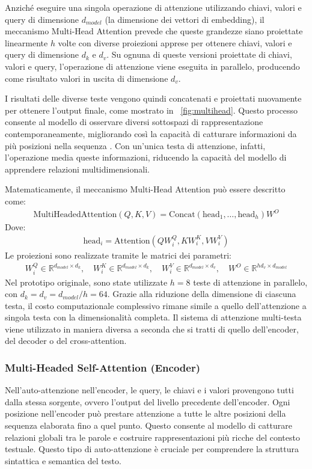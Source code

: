 Anziché eseguire una singola operazione di attenzione utilizzando chiavi, valori e query di dimensione \(d_{model}\) (la dimensione dei vettori di embedding), il meccanismo Multi-Head Attention prevede che queste grandezze siano proiettate linearmente \(h\) volte con diverse proiezioni apprese per ottenere chiavi, valori e query di dimensione \(d_k\) e \(d_v\). Su ognuna di queste versioni proiettate di chiavi, valori e query, l'operazione di attenzione viene eseguita in parallelo, producendo come risultato valori in uscita di dimensione \(d_v\).

I risultati delle diverse teste vengono quindi concatenati e proiettati nuovamente per ottenere l'output finale, come mostrato in \figurename{~\ref{fig:multihead}}. Questo processo consente al modello di osservare diversi sottospazi di rappresentazione contemporaneamente, migliorando così la capacità di catturare informazioni da più posizioni nella sequenza \cite{bertattention}. Con un'unica testa di attenzione, infatti, l'operazione media queste informazioni, riducendo la capacità del modello di apprendere relazioni multidimensionali.

Matematicamente, il meccanismo Multi-Head Attention può essere descritto come:
\begin{align}
	\text{MultiHeadedAttention}(Q, K, V) = \text{Concat}(\text{head}_1, \ldots, \text{head}_h)W^O
\end{align}
Dove:
\vspace{-0.25cm}
\begin{align}
	\text{head}_i = \text{Attention}(QW_i^Q, KW_i^K, VW_i^V)
\end{align}
Le proiezioni sono realizzate tramite le matrici dei parametri:
\begin{align}
	W_i^Q \in \mathbb{R}^{d_{model} \times d_k}, \quad W_i^K \in \mathbb{R}^{d_{model} \times d_k}, \quad W_i^V \in \mathbb{R}^{d_{model} \times d_v}, \quad W^O \in \mathbb{R}^{hd_v \times d_{model}}
\end{align}
Nel prototipo originale, sono state utilizzate \(h = 8\) teste di attenzione in parallelo, con \(d_k = d_v = d_{model}/h = 64\). Grazie alla riduzione della dimensione di ciascuna testa, il costo computazionale complessivo rimane simile a quello dell'attenzione a singola testa con la dimensionalità completa.
Il sistema di attenzione multi-testa viene utilizzato in maniera diversa a seconda che si tratti di quello dell'encoder, del decoder o del cross-attention.

\subsubsection{Multi-Headed Self-Attention (Encoder)}
Nell'auto-attenzione nell'encoder, le query, le chiavi e i valori provengono tutti dalla stessa sorgente, ovvero l'output del livello precedente dell'encoder. Ogni posizione nell'encoder può prestare attenzione a tutte le altre posizioni della sequenza elaborata fino a quel punto. Questo consente al modello di catturare relazioni globali tra le parole e costruire rappresentazioni più ricche del contesto testuale. Questo tipo di auto-attenzione è cruciale per comprendere la struttura sintattica e semantica del testo.

